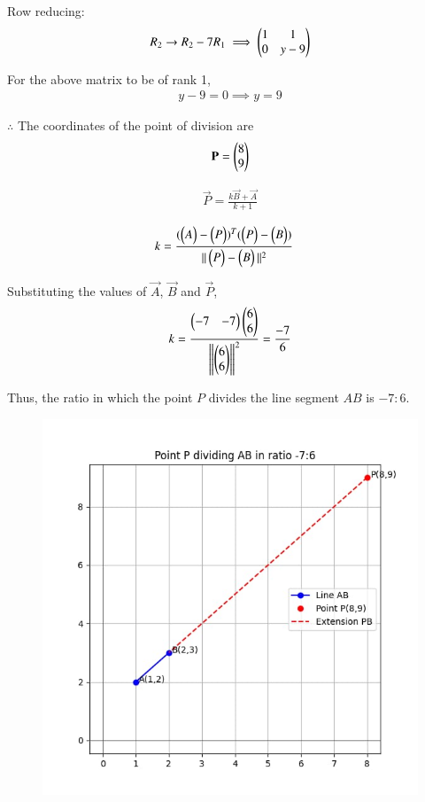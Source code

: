 \documentclass[journal]{IEEEtran}
\begin{document}
Row reducing:
\begin{align}
R_2 \rightarrow R_2 - 7R_1 \implies
\begin{pmatrix}
1 & 1 \\
0 & y-9
\end{pmatrix}
\end{align}

For the above matrix to be of rank 1,
\begin{align}
y-9 = 0 \implies y = 9
\end{align}

$\therefore$ The coordinates of the point of division are
\begin{align*}
\mathbf{P} = \begin{pmatrix}8 \\ 9\end{pmatrix}
\end{align*}

\begin{align}
    \vec{P} = \frac{k\vec{B}+\vec{A}}{k+1}
\end{align}

\begin{align}
k &= \frac{(\begin{pmatrix}A\end{pmatrix} - \begin{pmatrix}P\end{pmatrix})^T (\begin{pmatrix}P\end{pmatrix} - \begin{pmatrix}B\end{pmatrix})}{\|\begin{pmatrix}P\end{pmatrix} - \begin{pmatrix}B\end{pmatrix}\|^2}
\end{align}

Substituting the values of $\vec{A}$, $\vec{B}$ and $\vec{P}$,
\begin{align}
k=\frac{\begin{pmatrix}-7 & -7\end{pmatrix}\begin{pmatrix}6 \\ 6\end{pmatrix}}{\left\lVert\begin{pmatrix}6 \\ 6\end{pmatrix}\right\rVert^2}=\frac{-7}{6}
\end{align}

Thus, the ratio in which the point $P$ divides the line segment $AB$ is $\boxed{-7:6}$.


\begin{figure}[H]
    \centering
    \includegraphics[width=0.8\columnwidth]{figs/fig1.jpg}
    \caption{}
    \label{fig:placeholder}
\end{figure}
\end{document}
